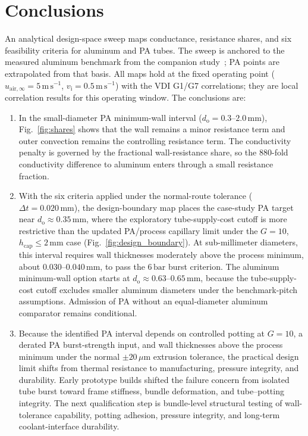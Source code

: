 \section{Conclusions}
\label{sec:conclusions}

An analytical design-space sweep maps conductance, resistance shares, and six
feasibility criteria for aluminum and PA tubes.
The sweep is anchored to the measured aluminum benchmark from the companion
study~\cite{Henzler2026}; PA points are extrapolated from that basis.
All maps hold at the fixed operating point
($u_{\mathrm{air},\infty}=5\,\mathrm{m\,s^{-1}}$,
$v_{\mathrm{i}}=0.5\,\mathrm{m\,s^{-1}}$) with the VDI G1/G7 correlations; they
are local correlation results for this operating window.
The conclusions are:

\begin{enumerate}

\item In the small-diameter PA minimum-wall interval
  ($d_{\mathrm{o}}=0.3$--$2.0\,\mathrm{mm}$), Fig.~\ref{fig:shares} shows that
  the wall remains a minor resistance term and outer convection remains the
  controlling resistance term.
  The conductivity penalty is governed by the fractional wall-resistance share,
  so the 880-fold conductivity difference to aluminum enters through a small
  resistance fraction.

\item With the six criteria applied under the normal-route tolerance
  ($\Delta t=0.020\,\mathrm{mm}$), the design-boundary map places the
  case-study PA target near $d_{\mathrm{o}}\approx 0.35\,\mathrm{mm}$, where
  the exploratory tube-supply-cost cutoff is more restrictive than the updated
  PA/process capillary limit under the $G=10$,
  $h_{\mathrm{cap}}\le2\,\mathrm{mm}$ case (Fig.~\ref{fig:design_boundary}).
  At sub-millimeter diameters, this interval requires wall thicknesses
  moderately above the process minimum, about
  $0.030$--$0.040\,\mathrm{mm}$, to pass the $6\,\mathrm{bar}$ burst criterion.
  The aluminum minimum-wall option starts at
  $d_{\mathrm{o}}\approx 0.63$--$0.65\,\mathrm{mm}$, because the
  tube-supply-cost cutoff excludes smaller aluminum diameters under the
  benchmark-pitch assumptions.
  Admission of PA without an equal-diameter aluminum comparator remains
  conditional.

\item Because the identified PA interval depends on controlled potting at
  $G=10$, a derated PA burst-strength input, and wall thicknesses above the
  process minimum under the normal $\pm 20\,\mu\mathrm{m}$ extrusion tolerance,
  the practical design limit shifts from thermal resistance to manufacturing,
  pressure integrity, and durability.
  Early prototype builds shifted the failure concern from isolated tube burst
  toward frame stiffness, bundle deformation, and tube--potting integrity.
  The next qualification step is bundle-level structural testing of
  wall-tolerance capability, potting adhesion, pressure integrity, and
  long-term coolant-interface durability.

\end{enumerate}
